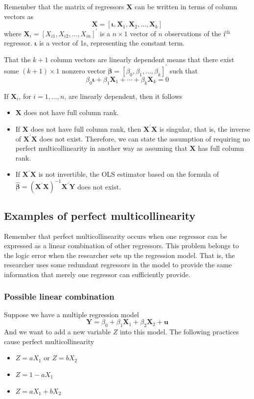 \documentclass[a4paper,11pt]{article}
\begin{document}
Remember that the matrix of regressors \(\mathbf{X}\) can be written in
terms of column vectors as
\[
\mathbf{X} = [\boldsymbol{\iota}, \mathbf{X}_1, \mathbf{X}_2, \ldots, \mathbf{X}_k ]
\]
where \(\mathbf{X}_i = [X_{i1}, X_{i2}, \ldots, X_{in}]^{\prime}\)
is a \(n \times 1\) vector of \(n\) observations of the i\(^{\text{th}}\)
regressor. \(\boldsymbol{\iota}\) is a vector of 1s, representing the
constant term.

That the \(k+1\) column vectors are linearly dependent means that there
exist some \((k+1) \times 1\) nonzero vector \(\boldsymbol{\beta} =
[\beta_0, \beta_1, \ldots, \beta_k]^{\prime}\) such that
\[
\beta_0 \boldsymbol{\iota} + \beta_1 \mathbf{X}_1 + \cdots + \beta_k
\mathbf{X}_k = 0 \]

If \(\mathbf{X}_i\), for \(i=1,\ldots,n\), are linearly dependent,
then it follows
\begin{itemize}
\item \(\mathbf{X}\) does not have full column rank.
\item If \(\mathbf{X}\) does not have full column rank, then
\(\mathbf{X}^{\prime} \mathbf{X}\) is singular, that is, the inverse
of \(\mathbf{X}^{\prime} \mathbf{X}\) does not exist. Therefore, we
can state the assumption of requiring no perfect multicollinearity
in another way as assuming that \(\mathbf{X}\) has full column rank.
\item If \(\mathbf{X}^{\prime} \mathbf{X}\) is not invertible, the OLS
estimator based on the formula of \(\boldsymbol{\hat{\beta}} =
  (\mathbf{X}^{\prime} \mathbf{X})^{-1} \mathbf{X}^{\prime}
  \mathbf{Y}\) does not exist.
\end{itemize}


\subsection{Examples of perfect multicollinearity}
\label{sec:org9d59d68}

Remember that perfect multicollinearity occurs when one regressor can
be expressed as a linear combination of other regressors. This problem
belongs to the logic error when the researcher sets up the regression
model. That is, the researcher uses some redundant regressors in the
model to provide the same information that merely one regressor can
sufficiently provide.

\subsubsection*{Possible linear combination}
\label{sec:org9e9e3e8}
Suppose we have a multiple regression model
\[ \mathbf{Y} = \beta_0 + \beta_1 \mathbf{X}_1 + \beta_2
\mathbf{X}_2 + \mathbf{u}  \]
And we want to add a new variable \(Z\) into this model. The following
practices cause perfect multicollinearity
\begin{itemize}
\item \(Z = a X_1\) or \(Z = b X_2\)
\item \(Z = 1 - a X_1\)
\item \(Z = a X_1 + b X_2\)
\end{itemize}
\end{document}
